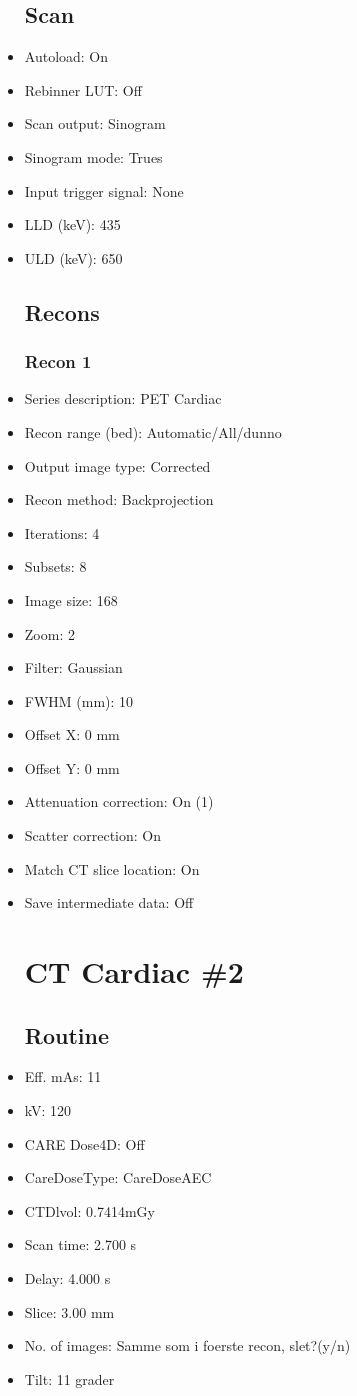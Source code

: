 \documentclass[12pt]{article}
\begin{document}
\begin{itemize}
\subsection{Scan}
\item Autoload: On
\item Rebinner LUT: Off
\item Scan output: Sinogram
\item Sinogram mode: Trues
\item Input trigger signal: None
\item LLD (keV): 435
\item ULD (keV): 650
\subsection{Recons}
\subsubsection{Recon 1}
\item Series description: PET Cardiac
\item Recon range (bed): Automatic/All/dunno
\item Output image type: Corrected
\item Recon method: Backprojection
\item Iterations: 4
\item Subsets: 8
\item Image size: 168
\item Zoom: 2
\item Filter: Gaussian
\item FWHM (mm): 10
\item Offset X: 0 mm
\item Offset Y: 0 mm
\item Attenuation correction: On (1)
\item Scatter correction: On
\item Match CT slice location: On
\item Save intermediate data: Off
\section{CT Cardiac \#2}
\subsection{Routine}
\item Eff. mAs: 11\item kV: 120\item CARE Dose4D: Off\item CareDoseType: CareDoseAEC\item CTDlvol: 0.7414mGy\item Scan time: 2.700 s\item Delay: 4.000 s\item Slice: 3.00 mm\item No. of images: Samme som i foerste recon, slet?(y/n)\item Tilt: 11 grader

\end{itemize}
\end{document}
